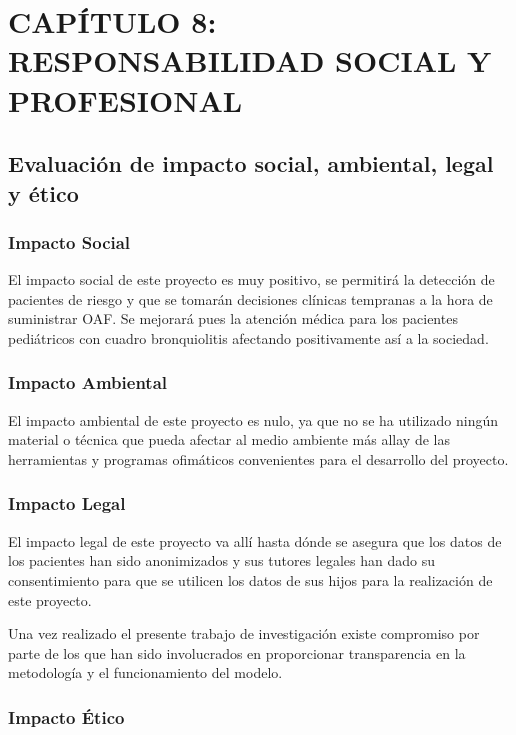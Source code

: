 \section{CAPÍTULO 8: RESPONSABILIDAD SOCIAL Y PROFESIONAL}\label{cap:responsabilidadSocialYProfesional}

\subsection{Evaluación de impacto social, ambiental, legal y ético}

\subsubsection{Impacto Social}

El impacto social de este proyecto es muy positivo, se permitirá la detección de pacientes de riesgo y que se tomarán decisiones clínicas tempranas a la hora de suministrar OAF. Se mejorará pues la atención médica para los pacientes pediátricos con cuadro bronquiolitis afectando positivamente así a la sociedad. 

\subsubsection{Impacto Ambiental}

El impacto ambiental de este proyecto es nulo, ya que no se ha utilizado ningún material o técnica que pueda afectar al medio ambiente más allay de las herramientas y programas ofimáticos convenientes para el desarrollo del proyecto.

\subsubsection{Impacto Legal}

El impacto legal de este proyecto va allí hasta dónde se asegura que los datos de los pacientes han sido anonimizados y sus tutores legales han dado su consentimiento para que se utilicen los datos de sus hijos para la realización de este proyecto.

Una vez realizado el presente trabajo de investigación existe compromiso por parte de los que han sido involucrados en proporcionar transparencia en la metodología y el funcionamiento del modelo. 

\subsubsection{Impacto Ético}

